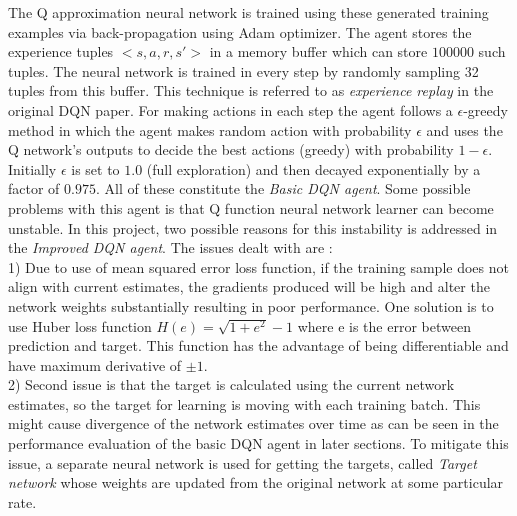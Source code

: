 \documentclass{article}
\begin{document}
The Q approximation neural network is trained using these generated training examples via back-propagation using Adam\cite{adam} optimizer. The agent stores the experience tuples $<s, a, r, s'>$ in a memory buffer which can store $100000$ such tuples. The neural network is trained in every step by randomly sampling 32 tuples from this buffer. This technique is referred to as \textit{experience replay} in the original DQN paper. For making actions in each step the agent follows a $\epsilon$-greedy method in which the agent makes random action with probability $\epsilon$ and uses the Q network's outputs to decide the best actions (greedy) with probability $1-\epsilon$. Initially $\epsilon$ is set to $1.0$ (full exploration) and then decayed exponentially by a factor of $0.975$. All of these constitute the \textit{Basic DQN agent}. Some possible problems with this agent is that Q function neural network learner can become unstable. In this project, two possible reasons for this instability is addressed in the \textit{Improved DQN agent}. The issues dealt with are :\\1) Due to use of mean squared error loss function, if the training sample does not align with current estimates, the gradients produced will be high and alter the network weights substantially resulting in poor performance. One solution is to use Huber loss function $H(e) = \sqrt{1+e^2} - 1$ where e is the error between prediction and target. This function has the advantage of being differentiable and have maximum derivative of $\pm1$.\\2) Second issue is that the target is calculated using the current network estimates, so the target for learning is moving with each training batch. This might cause divergence of the network estimates over time as can be seen in the performance evaluation of the basic DQN agent in later sections. To mitigate this issue, a separate neural network is used for getting the targets, called \textit{Target network} whose weights are updated from the original network at some particular rate.
\end{document}

